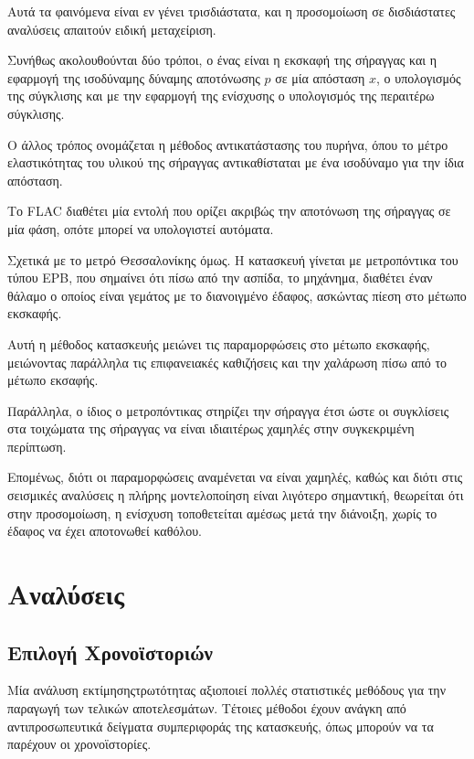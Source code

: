 Αυτά τα φαινόμενα είναι εν γένει τρισδιάστατα, και η προσομοίωση σε δισδιάστατες αναλύσεις απαιτούν ειδική μεταχείριση.

Συνήθως ακολουθούνται δύο τρόποι, ο ένας είναι η εκσκαφή της σήραγγας και η εφαρμογή της ισοδύναμης δύναμης αποτόνωσης $p$ σε μία απόσταση $x$, ο υπολογισμός της σύγκλισης και με την εφαρμογή της ενίσχυσης ο υπολογισμός της περαιτέρω σύγκλισης.

Ο άλλος τρόπος ονομάζεται η μέθοδος αντικατάστασης του πυρήνα, όπου το μέτρο ελαστικότητας του υλικού της σήραγγας αντικαθίσταται με ένα ισοδύναμο για την ίδια απόσταση.

Το FLAC διαθέτει μία εντολή που ορίζει ακριβώς την αποτόνωση της σήραγγας σε μία φάση, οπότε μπορεί να υπολογιστεί αυτόματα.

Σχετικά με το μετρό Θεσσαλονίκης όμως. Η κατασκευή γίνεται με μετροπόντικα του τύπου EPB, που σημαίνει ότι πίσω από την ασπίδα, το μηχάνημα, διαθέτει έναν θάλαμο ο οποίος είναι γεμάτος με το διανοιγμένο έδαφος, ασκώντας πίεση στο μέτωπο εκσκαφής.

Αυτή η μέθοδος κατασκευής μειώνει τις παραμορφώσεις στο μέτωπο εκσκαφής, μειώνοντας παράλληλα τις επιφανειακές καθιζήσεις και την χαλάρωση πίσω από το μέτωπο εκσαφής.

Παράλληλα, ο ίδιος ο μετροπόντικας στηρίζει την σήραγγα έτσι ώστε οι συγκλίσεις στα τοιχώματα της σήραγγας να είναι ιδιαιτέρως χαμηλές στην συγκεκριμένη περίπτωση.

Επομένως, διότι οι παραμορφώσεις αναμένεται να είναι χαμηλές, καθώς και διότι στις σεισμικές αναλύσεις η πλήρης μοντελοποίηση είναι λιγότερο σημαντική, θεωρείται ότι στην προσομοίωση, η ενίσχυση τοποθετείται αμέσως μετά την διάνοιξη, χωρίς το έδαφος να έχει αποτονωθεί καθόλου.




\section{Αναλύσεις}

\subsection{Επιλογή Χρονοϊστοριών}
Μία ανάλυση εκτίμησηςτρωτότητας αξιοποιεί πολλές στατιστικές μεθόδους για την παραγωγή των τελικών αποτελεσμάτων. Τέτοιες μέθοδοι έχουν ανάγκη από αντιπροσωπευτικά δείγματα συμπεριφοράς της κατασκευής, όπως μπορούν να τα παρέχουν οι χρονοϊστορίες.


